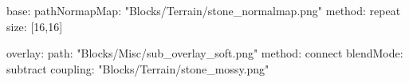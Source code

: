 base:
  pathNormapMap: "Blocks/Terrain/stone_normalmap.png"
  method: repeat
  size: [16,16]

overlay:
  path: "Blocks/Misc/sub_overlay_soft.png"
  method: connect
  blendMode: subtract
  coupling: "Blocks/Terrain/stone_mossy.png"